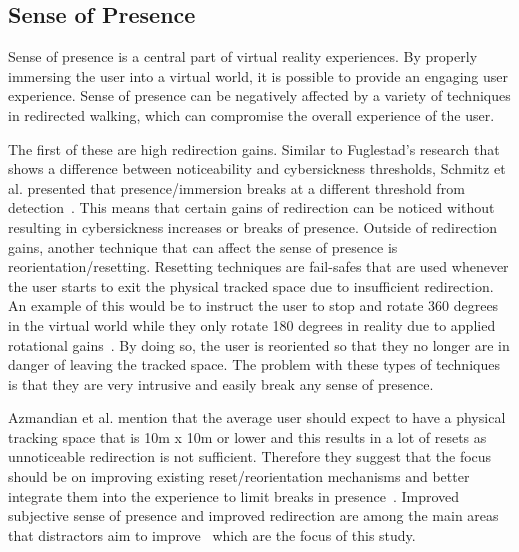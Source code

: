 \subsection{Sense of Presence}
Sense of presence is a central part of virtual reality experiences. By properly immersing the user into a virtual world, it is possible to provide an engaging user experience. Sense of presence can be negatively affected by a variety of techniques in redirected walking, which can compromise the overall experience of the user. 

The first of these are high redirection gains. Similar to Fuglestad's research that shows a difference between noticeability and cybersickness thresholds, Schmitz et al. presented that presence/immersion breaks at a different threshold from detection~\cite{schmitz2018you}. This means that certain gains of redirection can be noticed without resulting in cybersickness increases or breaks of presence.
Outside of redirection gains, another technique that can affect the sense of presence is reorientation/resetting. Resetting techniques are fail-safes that are used whenever the user starts to exit the physical tracked space due to insufficient redirection. An example of this would be to instruct the user to stop and rotate 360 degrees in the virtual world while they only rotate 180 degrees in reality due to applied rotational gains~\cite{suma2012taxonomy}. By doing so, the user is reoriented so that they no longer are in danger of leaving the tracked space. The problem with these types of techniques is that they are very intrusive and easily break any sense of presence. 

Azmandian et al. mention that the average user should expect to have a physical tracking space that is 10m x 10m or lower and this results in a lot of resets as unnoticeable redirection is not sufficient. Therefore they suggest that the focus should be on improving existing reset/reorientation mechanisms and better integrate them into the experience to limit breaks in presence~\cite{azmandian2015physical}. Improved subjective sense of presence and improved redirection are among the main areas that distractors aim to improve~\cite{peck2009evaluation, peck2011evaluation} which are the focus of this study.

